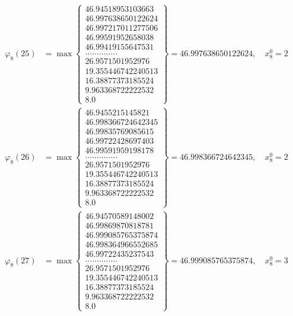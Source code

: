 \documentclass{article}
\begin{document}
\begin{align*}
  
  
  
\varphi_{8}(25) &= \max \left\{ \begin{array}{c}
46.94518953103663 \\
 46.997638650122624 \\
 46.997217011277506 \\
 46.99591952658038 \\
 46.99419155647531 \\
 .............. \\
 26.9571501952976 \\
 19.355446742240513 \\
 16.38877373185524 \\
 9.963368722222532 \\
 8.0
\end{array} \right\} = 46.997638650122624, \quad x_{8}^0 = 2\\
  
  
  
  
\varphi_{8}(26) &= \max \left\{ \begin{array}{c}
46.9455215145821 \\
 46.998366724642345 \\
 46.99835769085615 \\
 46.99722428697403 \\
 46.99591959198178 \\
 .............. \\
 26.9571501952976 \\
 19.355446742240513 \\
 16.38877373185524 \\
 9.963368722222532 \\
 8.0
\end{array} \right\} = 46.998366724642345, \quad x_{8}^0 = 2\\
  
  
  
  
\varphi_{8}(27) &= \max \left\{ \begin{array}{c}
46.94570589148002 \\
 46.99869870818781 \\
 46.999085765375874 \\
 46.998364966552685 \\
 46.99722435237543 \\
 .............. \\
 26.9571501952976 \\
 19.355446742240513 \\
 16.38877373185524 \\
 9.963368722222532 \\
 8.0
\end{array} \right\} = 46.999085765375874, \quad x_{8}^0 = 3\\
  

\end{align*}
\end{document}
